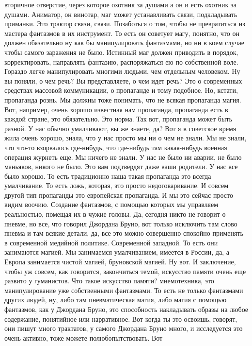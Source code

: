 вторичное отверстие, через которое охотник за душами а он и есть охотник за
душами. Аниматор, он винотар, маг может устанавливать связи, подкладывать
приманки. Это трактор связи, связи. Позаботься о том, чтобы не превратиться из
мастера фантазмов в их инструмент. То есть он советует магу, понятно, что он
должен обязательно ну как бы манипулировать фантазмами, но ни в коем случае
чтобы самого заражения не было. Истинный маг должен приводить в порядок,
корректировать, направлять фантазию, распоряжаться ею по собственной воле.
Гораздо легче манипулировать многими людьми, чем отдельным человеком. Ну вы
поняли, о чем речь? Вы представляете, о чем идет речь? Это о современных
средствах массовой коммуникации, о пропаганде и тому подобное. Но, кстати,
пропаганда рознь. Мы должны тоже понимать, что не всякая пропаганда магия. Вот,
например, очень хорошо известная нам пропаганда, пропаганда есть в каждой
стране, это обязательно. Это норма. Так вот, пропаганда может быть разной. У нас
обычно умалчивают, вы же знаете, да? Вот я в советское время жила очень хорошо,
знала, что у нас просто мы ни о чем не знали. Мы не знали, что что-то взорвалось
где-нибудь, что где-нибудь там какая-нибудь военная операция журнеть еще. Мы
ничего не знали. У нас не было ни аварии, не было маньяков, никого не было. Это
вам подтвердят даже ваши родители. У нас все было хорошо. То есть традиционно
наша такая пропаганда это всегда умалчивание. То есть ложь, которая, это просто
недоговаривание. И совсем другой тип пропаганды это европейская пропаганда. И мы
это сейчас просто видим воочию. Создание фантазмов, с помощью которых мы
управляем реальностью, помещая их в чужие головы. Да, сегодня никто не говорит о
пневме, но все, что говорил Джордана Бруно, вот только исключить там слово
пневма и там всякие детали, да, все это можно совершенно спокойно применять в
современной медийной политике. Современной западной. То есть они занимаются
магией. Мы занимаемся умалчиванием, имеется в России, да, а Европа занимается
чистой магией, бруновской магией. Ну вот. И заключение, чтобы уж совсем, как
говорится, закончиться темой, искусство памяти очень еще развито у гуманистов.
Что такое искусство памяти? мнемотехника, это манипулирование уже собственными
фантазмами. То есть не только фантазмами других людей, ну, либо там
пневматическая магия, либо магия с помощью фантазмов, как у Джордана Бруно, это
способность накладывать образы на любое содержание, понятийное или нарративное.
Вот когда ты это освоишь, говорят, они пишут много трактатов, у самого Джордана
Бруно много, и исследуется это очень активно, тоже можете полюбопытствовать. Вот
